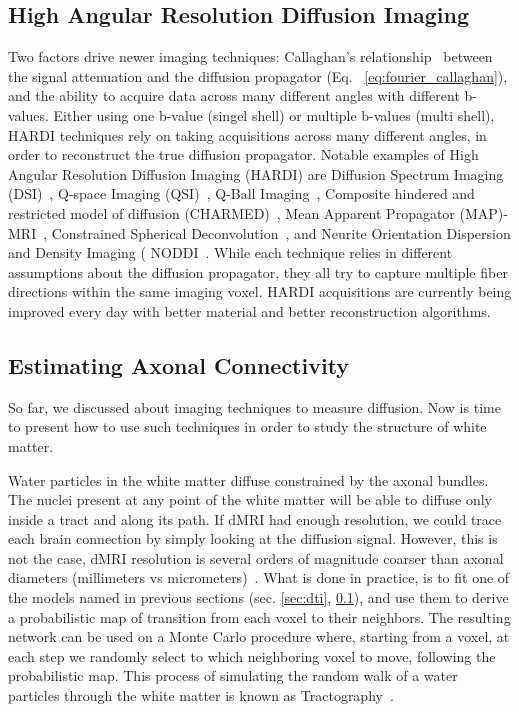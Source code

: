 \subsection{High Angular Resolution Diffusion Imaging}
\label{sec:hardi}
Two factors drive newer imaging techniques: Callaghan's relationship~\cite{Callaghan1991}
between the signal attenuation and the diffusion propagator 
(Eq. ~\ref{eq:fourier_callaghan}), and the ability to acquire data across many
different angles with different b-values. Either using one b-value (singel shell)
or multiple b-values (multi shell), HARDI techniques rely on taking acquisitions
across many different angles, in order to reconstruct the true diffusion propagator.
Notable examples of High Angular Resolution Diffusion Imaging (HARDI) are Diffusion
Spectrum Imaging (DSI)~\cite{Wedeen2008}, Q-space Imaging (QSI)~\cite{Callaghan1991},
Q-Ball Imaging~\cite{Tuch2004}, Composite hindered and restricted model of diffusion (CHARMED)~\cite{Assaf2005},
Mean Apparent Propagator (MAP)-MRI~\cite{Ozarslan2013}, 
Constrained Spherical Deconvolution~\cite{Tournier2004}, and Neurite
Orientation Dispersion and Density Imaging ( NODDI~\cite{Zhang2012}. While each technique
relies in different assumptions about the diffusion propagator,
they all try to capture multiple fiber directions within the same imaging
voxel. HARDI acquisitions are currently being improved every day with better 
material and better reconstruction algorithms.

\subsection{Estimating Axonal Connectivity}
So far, we discussed about imaging techniques to measure diffusion. Now is time
to present how to use such techniques in order to study the structure of white matter.

Water particles in the white matter diffuse constrained by the axonal bundles.
The nuclei present at any point of the white matter will be able to diffuse
only inside a tract and along its path. If dMRI had enough resolution, we
could trace each brain connection by simply looking at the diffusion signal.
However, this is not the case, dMRI resolution is several orders of magnitude
coarser than axonal diameters (millimeters vs micrometers)~\cite{VanEssen2014}.
What is done in practice, is to fit one of the models named in previous sections
(sec. \ref{sec:dti}, \ref{sec:hardi}), and use them to derive a probabilistic
map of transition from each voxel to their neighbors. The resulting network can
be used on a Monte Carlo procedure where, starting from a voxel, at each step we
randomly select to which neighboring voxel to move, following the
probabilistic map. This process of simulating the random walk of a water
particles through the white matter is known as Tractography~\cite{Behrens2003a}.

